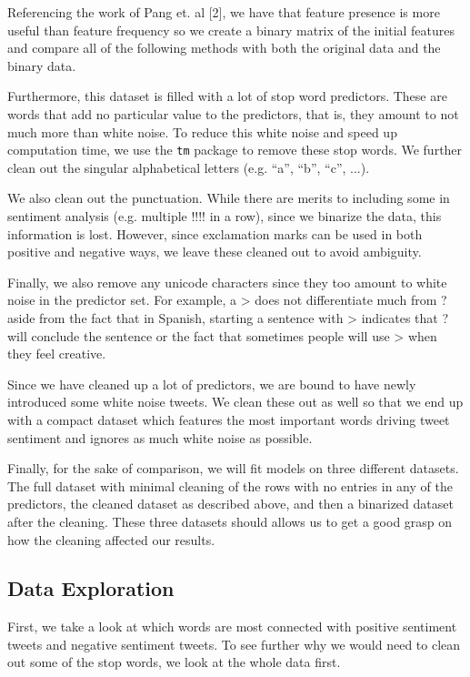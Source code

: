 \documentclass{article}
\begin{document}
Referencing the work of Pang et. al [2], we have that feature presence is more useful than feature frequency so we create a binary matrix of the initial features and compare all of the following methods with both the original data and the binary data.

Furthermore, this dataset is filled with a lot of stop word predictors. These are words that add no particular value to the predictors, that is, they amount to not much more than white noise. To reduce this white noise and speed up computation time, we use the \texttt{tm} package to remove these stop words. We further clean out the singular alphabetical letters (e.g. ``a'', ``b'', ``c'', ...). 

We also clean out the punctuation. While there are merits to including some in sentiment analysis (e.g. multiple !!!! in a row), since we binarize the data, this information is lost. However, since exclamation marks can be used in both positive and negative ways, we leave these cleaned out to avoid ambiguity. %

Finally, we also remove any unicode characters since they too amount to white noise in the predictor set. For example, a > does not differentiate much from ? aside from the fact that in Spanish, starting a sentence with > indicates that ? will conclude the sentence or the fact that sometimes people will use > when they feel creative. 

Since we have cleaned up a lot of predictors, we are bound to have newly introduced some white noise tweets. We clean these out as well so that we end up with a compact dataset which features the most important words driving tweet sentiment and ignores as much white noise as possible.

Finally, for the sake of comparison, we will fit models on three different datasets. The full dataset with minimal cleaning of the rows with no entries in any of the predictors, the cleaned dataset as described above, and then a binarized dataset after the cleaning. These three datasets should allows us to get a good grasp on how the cleaning affected our results.

\subsection{Data Exploration}
First, we take a look at which words are most connected with positive sentiment tweets and negative sentiment tweets. To see further why we would need to clean out some of the stop words, we look at the whole data first. 
\end{document}
